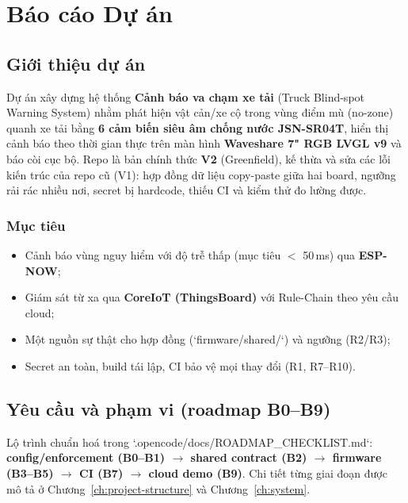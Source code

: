\chapter{Báo cáo Dự án}
\label{ch:project-report}

\section{Giới thiệu dự án}
\label{sec:pr-intro}

Dự án xây dựng hệ thống \textbf{Cảnh báo va chạm xe tải} (Truck Blind-spot Warning
System) nhằm phát hiện vật cản/xe cộ trong vùng điểm mù (no-zone) quanh xe tải bằng
\textbf{6 cảm biến siêu âm chống nước JSN-SR04T}, hiển thị cảnh báo theo thời gian thực
trên màn hình \textbf{Waveshare 7" RGB LVGL v9} và báo còi cục bộ. Repo
 là bản chính thức \textbf{V2} (Greenfield), kế thừa và sửa các
lỗi kiến trúc của repo cũ  (V1): hợp đồng dữ liệu
copy-paste giữa hai board, ngưỡng rải rác nhiều nơi, secret bị hardcode, thiếu CI và
kiểm thử đo lường được.

\subsection{Mục tiêu}
\begin{itemize}
\item Cảnh báo vùng nguy hiểm với độ trễ thấp (mục tiêu $<$ 50\,ms) qua \textbf{ESP-NOW};
\item Giám sát từ xa qua \textbf{CoreIoT (ThingsBoard)} với Rule-Chain theo yêu cầu cloud;
\item Một nguồn sự thật cho hợp đồng (`firmware/shared/`) và ngưỡng (R2/R3);
\item Secret an toàn, build tái lập, CI bảo vệ mọi thay đổi (R1, R7--R10).
\end{itemize}

\section{Yêu cầu và phạm vi (roadmap B0--B9)}
\label{sec:pr-scope}

Lộ trình chuẩn hoá trong `.opencode/docs/ROADMAP\_CHECKLIST.md`:
\textbf{config/enforcement (B0--B1) $\rightarrow$ shared contract (B2) $\rightarrow$ firmware
(B3--B5) $\rightarrow$ CI (B7) $\rightarrow$ cloud demo (B9)}. Chi tiết từng giai đoạn
được mô tả ở Chương~\ref{ch:project-structure} và Chương~\ref{ch:system}.

